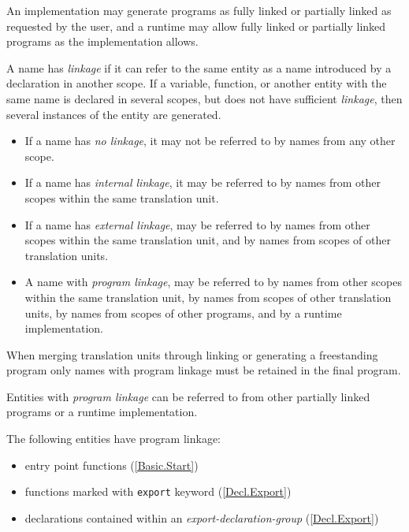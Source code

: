 \p An implementation may generate programs as fully linked or partially linked
as requested by the user, and a runtime may allow fully linked or partially
linked programs as the implementation allows.

\p A name has \textit{linkage} if it can refer to the same entity as a name
introduced by a declaration in another scope. If a variable, function, or
another entity with the same name is declared in several scopes, but does not
have sufficient \textit{linkage}, then several instances of the entity are
generated.

\begin{itemize}
\item If a name has \textit{no linkage}, it may not be referred to by names from
any other scope.
\item If a name has \textit{internal linkage}, it may be referred to by names
from other scopes within the same translation unit.
\item If a name has \textit{external linkage}, may be referred to by names from
other scopes within the same translation unit, and by names from scopes of other
translation units.
\item A name with \textit{program linkage}, may be referred to by names from
other scopes within the same translation unit, by names from scopes of other
translation units, by names from scopes of other programs, and by a runtime
implementation.
\end{itemize}

\p When merging translation units through linking or generating a freestanding
program only names with program linkage must be retained in the final program.


\p Entities with \textit{program linkage} can be referred to from other
partially linked programs or a runtime implementation.

\p The following entities have program linkage:
\begin{itemize}
  \item entry point functions (\ref{Basic.Start})
  \item functions marked with \texttt{export} keyword (\ref{Decl.Export})
  \item declarations contained within an \textit{export-declaration-group} (\ref{Decl.Export})
\end{itemize}



